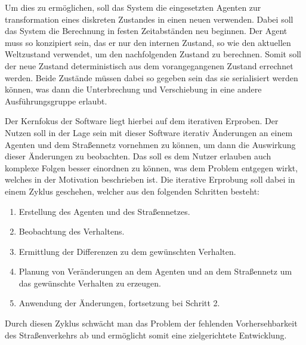 Um dies zu ermöglichen, soll das System die eingesetzten Agenten zur transformation eines diskreten Zustandes in einen neuen verwenden.
Dabei soll das System die Berechnung in festen Zeitabständen neu beginnen.
Der Agent muss so konzipiert sein, das er nur den internen Zustand, so wie den aktuellen Weltzustand verwendet, um den nachfolgenden Zustand zu berechnen.
Somit soll der neue Zustand deterministisch aus dem vorangegangenen Zustand errechnet werden.
Beide Zustände müssen dabei so gegeben sein das sie serialisiert werden können, was dann die Unterbrechung und Verschiebung in eine andere Ausführungsgruppe erlaubt.

Der Kernfokus der Software liegt hierbei auf dem iterativen Erproben.
Der Nutzen soll in der Lage sein mit dieser Software iterativ Änderungen an einem Agenten und dem Straßennetz vornehmen zu können, um dann die Auswirkung dieser Änderungen zu beobachten.
Das soll es dem Nutzer erlauben auch komplexe Folgen besser einordnen zu können, was dem Problem entgegen wirkt, welches in der Motivation beschrieben ist.
Die iterative Erprobung soll dabei in einem Zyklus geschehen, welcher aus den folgenden Schritten besteht:

\begin{enumerate}
    \item Erstellung des Agenten und des Straßennetzes.
    \item Beobachtung des Verhaltens.
    \item Ermittlung der Differenzen zu dem gewünschten Verhalten.
    \item Planung von Veränderungen an dem Agenten und an dem Straßennetz um das gewünschte Verhalten zu erzeugen.
    \item Anwendung der Änderungen, fortsetzung bei Schritt 2.
\end{enumerate}
Durch diesen Zyklus schwächt man das Problem der fehlenden Vorhersehbarkeit des Straßenverkehrs ab und ermöglicht somit eine zielgerichtete Entwicklung.

